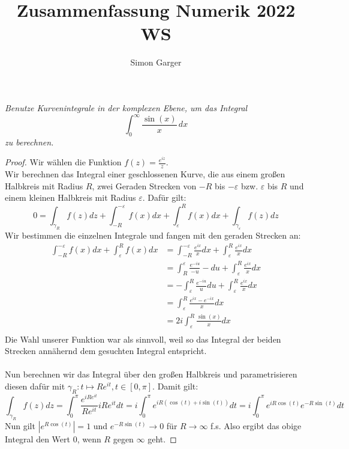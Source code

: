 \documentclass[11pt]{article}
\title{Zusammenfassung Numerik 2022 WS}
\author{Simon Garger}
\newenvironment{problem}[2][Beispiel]{
    \begin{trivlist}
        \item[\hskip \labelsep {\bfseries #1}\hskip \labelsep {\bfseries #2.}] \itshape}{
    \end{trivlist}\normalshape
}
\begin{document}
    \begin{problem}{1}
        Benutze Kurvenintegrale in der komplexen Ebene, um das Integral
        $$\int_0^{\infty}\frac{\sin(x)}{x}\,dx$$
        zu berechnen.
    \end{problem}

    \begin{proof}
        Wir wählen die Funktion $f(z) = \frac{e^{iz}}{z}$.\\
        Wir berechnen das Integral einer geschlossenen Kurve, die aus einem
        großen Halbkreis mit Radius $R$, zwei Geraden Strecken von
        $-R$ bis $-\varepsilon$ bzw. $\varepsilon$ bis $R$ und einem kleinen
        Halbkreis mit Radius $\varepsilon$. Dafür gilt:
        $$0 = \int_{\gamma_R}f(z)dz+\int_{-R}^{-\varepsilon} f(x)dx
        +\int_{\varepsilon}^R f(x)dx + \int_{\gamma_{\varepsilon}}f(z)dz$$
        Wir bestimmen die einzelnen Integrale und fangen mit den geraden Strecken an:
        $$\begin{aligned}
              \int_{-R}^{-\varepsilon} f(x)dx +\int_{\varepsilon}^R f(x)dx &=
              \int_{-R}^{-\varepsilon} \frac{e^{ix}}{x}dx +\int_{\varepsilon}^R
              \frac{e^{ix}}{x}dx\\
              &= \int_{R}^{\varepsilon} \frac{e^{-iu}}{-u}-du +\int_{\varepsilon}^R
              \frac{e^{ix}}{x}dx\\
              &= -\int_{\varepsilon}^R \frac{e^{-iu}}{u}du +\int_{\varepsilon}^R
              \frac{e^{ix}}{x}dx\\
              &= \int_{\varepsilon}^R \frac{e^{ix}-e^{-ix}}{x}dx\\
              &= 2i\int_{\varepsilon}^R \frac{\sin(x)}{x}dx\\
        \end{aligned} $$
        Die Wahl unserer Funktion war als sinnvoll, weil so das Integral der beiden
        Strecken annähernd dem gesuchten Integral entspricht.\\\\
        Nun berechnen wir das Integral über den großen Halbkreis und parametrisieren
        diesen dafür mit $\gamma_R: t\mapsto Re^{it}, t\in [0,\pi]$. Damit gilt:
        $$\int_{\gamma_R}f(z)dz = \int_0^\pi \frac{e^{iRe^{it}}}{Re^{it}} iRe^{it}dt =
        i\int_0^\pi e^{iR (\cos(t)+ i \sin(t))}dt =
        i\int_0^\pi e^{iR\cos(t)} e^{-R\sin(t)}dt$$
        Nun gilt $|e^{R\cos(t)}| = 1$ und $e^{-R\sin(t)} \to 0$ für $R\to \infty$ f.s.
        Also ergibt das obige Integral den Wert $0$, wenn $R$ gegen $\infty$ geht.

\end{proof}
\end{document}
